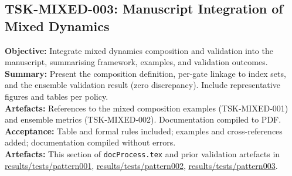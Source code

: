 \documentclass{article}
\begin{document}
\subsection{TSK-MIXED-003: Manuscript Integration of Mixed Dynamics}
\textbf{Objective:} Integrate mixed dynamics composition and validation into the manuscript, summarising framework, examples, and validation outcomes.\\
\textbf{Summary:} Present the composition definition, per-gate linkage to index sets, and the ensemble validation result (zero discrepancy). Include representative figures and tables per policy.\\
\textbf{Artefacts:} References to the mixed composition examples (TSK‑MIXED‑001) and ensemble metrics (TSK‑MIXED‑002). Documentation compiled to PDF.
\textbf{Acceptance:} Table and formal rules included; examples and cross-references added; documentation compiled without errors.\\
\textbf{Artefacts:} This section of \texttt{docProcess.tex} and prior validation artefacts in \url{results/tests/pattern001}, \url{results/tests/pattern002}, \url{results/tests/pattern003}.
\end{document}
